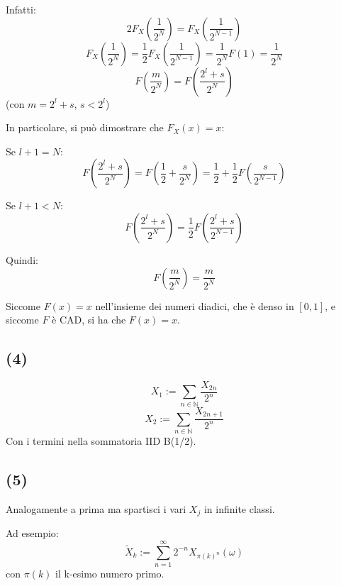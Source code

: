 \documentclass{article}
\begin{document}
Infatti:
\[
	2F_X\left(\frac{1}{2^N}\right)=F_X\left(\frac{1}{2^{N-1}}\right)
\]
\[F_X\left(\frac{1}{2^N}\right) = \frac{1}{2}F_X\left(\frac{1}{2^{N-1}}\right) = \frac{1}{2^N}F(1) = \frac{1}{2^N}\]
\[F\left(\frac{m}{2^N}\right) = F\left(\frac{2^l+s}{2^N}\right)\]
(con $m=2^l+s$, $s<2^l$)

In particolare, si può dimostrare che $F_X(x) = x$:

Se $l+1=N$:
\[F\left(\frac{2^l+s}{2^N}\right) = F\left(\frac{1}{2} + \frac{s}{2^N}\right) = \frac{1}{2} + \frac{1}{2}F\left(\frac{s}{2^{N-1}}\right)\]

Se $l+1<N$:
\[F\left(\frac{2^l+s}{2^N}\right) = \frac{1}{2} F\left(\frac{2^l+s}{2^{N-1}}\right)\]

Quindi:
\[F\left(\frac{m}{2^N}\right) = \frac{m}{2^N}\]

Siccome $F(x)=x$ nell'insieme dei numeri diadici, che è denso in $[0,1]$, e siccome $F$ è CAD, si ha che $F(x)=x$.

\subsection{(4)}
\[
	X_1 := \sum_{n\in \mathbb{N}} \frac{X_{2n}}{2^n}
\]
\[
	X_2 := \sum_{n\in \mathbb{N}}\frac{X_{2n+1}}{2^n}
\]
Con i termini nella sommatoria IID B(1/2).

\subsection{(5)}
Analogamente a prima ma spartisci i vari $X_j$ in infinite classi.

Ad esempio:
\[\widetilde{X}_k := \sum_{n=1}^{\infty }2^{-n} X_{\pi (k)^n}(\omega )\]
con $\pi (k)$ il k-esimo numero primo.
\end{document}
